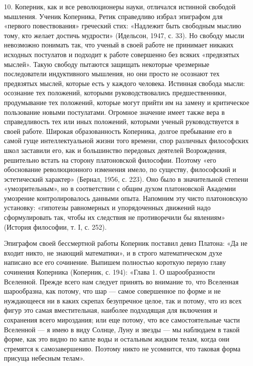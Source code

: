 10. Коперник, как и все революционеры науки, отличался истинной
свободой мышления. Ученик Коперника, Ретик справедливо избрал
эпиграфом для «первого повествования» греческий стих: «Надлежит быть
свободным мыслию тому, кто желает достичь мудрости» (Идельсон, 1947,
с. 33). Но свободу мысли невозможно понимать так, что ученый в своей
работе не принимает никаких исходных постулатов и подходит к работе
совершенно без всяких «предвзятых мыслей». Такую свободу пытаются
защищать некоторые чрезмерные последователи индуктивного мышления, но
они просто не осознают тех предвзятых мыслей, которые есть у каждого
человека. Истинная свобода мысли: осознание тех положений, которыми
руководствовались предшественники, продумывание тех положений, которые
могут прийти им на замену и критическое пользование новыми
постулатами. Огромное значение имеет также вера в справедливость тех
или иных положений, которыми ученый руководствуется в своей работе.
Широкая образованность Коперника, долгое пребывание его в самой гуще
интеллектуальной жизни того времени, спор различных философских школ
заставили его, как и большинство передовых деятелей Возрождения,
решительно встать на сторону платоновской философии. Поэтому «его
обоснование революционного изменения имело, по существу, философский и
эстетический характер» (Бернал, 1956, с. 223). Оно было в значительной
степени «умозрительным», но в соответствии с общим духом платоновской
Академии умозрение контролировалось данными опыта. Напомним эту чисто
платоновскую установку: «гипотезы равномерных и упорядоченных движений
надо сформулировать так, чтобы их следствия не противоречили бы
явлениям» (История философии, т. I, с. 252).

Эпиграфом своей бессмертной работы Коперник поставил девиз Платона:
«Да не входит никто, не знающий математики», и в строго математическом
духе написано все его сочинение. Выпишем полностью короткую первую
главу сочинения Коперника (Коперник, с. 194): «Глава 1. О
шарообразности Вселенной. Прежде всего нам следует принять во внимание
то, что Вселенная шарообразна, как потому, что шар --- самое
совершенное по форме и не нуждающееся ни в каких скрепах безупречное
целое, так и потому, что из всех фигур это самая вместительная,
наиболее подходящая для включения и сохранения всего мироздания; или
еще потому, что все самостоятельные части Вселенной --- я имею в виду
Солнце, Луну и звезды --- мы наблюдаем в такой форме, как это видно по
капле воды и остальным жидким телам, когда они стремятся к
самозавершению. Поэтому никто не усомнится, что таковая форма присуща
небесным телам».

